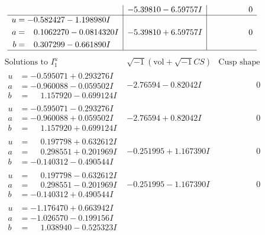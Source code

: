 \documentclass[1p]{elsarticle_modified}
\theoremstyle{definition}
\newcommand{\I}{\sqrt{-1}}
\begin{document}
$$\begin{array}{c|c|c}
 & -5.39810 - 6.59757 I & \phantom{-0.000000 } 0 \\ \hline\begin{aligned}
u &= -0.582427 - 1.198980 I \\
a &= \phantom{-}0.1062270 - 0.0814320 I \\
b &= \phantom{-}0.307299 - 0.661890 I\end{aligned}
 & -5.39810 + 6.59757 I & \phantom{-0.000000 } 0\\
 \hline 
 \end{array}$$\newpage$$\begin{array}{c|c|c}  
\text{Solutions to }I^u_{1}& \I (\text{vol} + \sqrt{-1}CS) & \text{Cusp shape}\\
 \hline 
\begin{aligned}
u &= -0.595071 + 0.293276 I \\
a &= -0.960088 - 0.059502 I \\
b &= \phantom{-}1.157920 - 0.699124 I\end{aligned}
 & -2.76594 - 0.82042 I & \phantom{-0.000000 } 0 \\ \hline\begin{aligned}
u &= -0.595071 - 0.293276 I \\
a &= -0.960088 + 0.059502 I \\
b &= \phantom{-}1.157920 + 0.699124 I\end{aligned}
 & -2.76594 + 0.82042 I & \phantom{-0.000000 } 0 \\ \hline\begin{aligned}
u &= \phantom{-}0.197798 + 0.632612 I \\
a &= \phantom{-}0.298551 + 0.201969 I \\
b &= -0.140312 - 0.490544 I\end{aligned}
 & -0.251995 + 1.167390 I & \phantom{-0.000000 } 0 \\ \hline\begin{aligned}
u &= \phantom{-}0.197798 - 0.632612 I \\
a &= \phantom{-}0.298551 - 0.201969 I \\
b &= -0.140312 + 0.490544 I\end{aligned}
 & -0.251995 - 1.167390 I & \phantom{-0.000000 } 0 \\ \hline\begin{aligned}
u &= -1.176470 + 0.663942 I \\
a &= -1.026570 - 0.199156 I \\
b &= \phantom{-}1.038940 - 0.525323 I\end{aligned}

\end{array}$$
\end{document}
